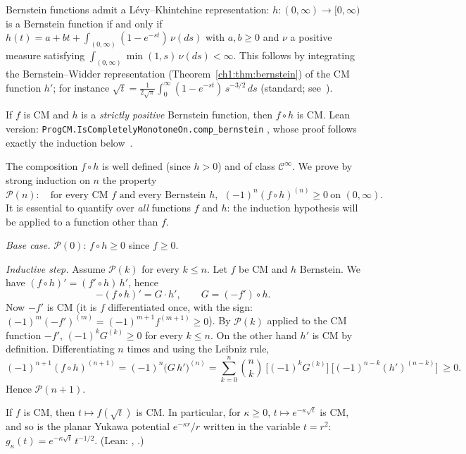 \begin{uniremark}\tierL{} Bernstein functions admit a L\'evy--Khintchine representation: $h:(0,\infty)\to[0,\infty)$ is a Bernstein function
if and only if $h(t)=a+bt+\int_{(0,\infty)}(1-e^{-st})\,\nu(ds)$ with $a,b\ge0$ and $\nu$ a positive measure satisfying
$\int_{(0,\infty)}\min(1,s)\,\nu(ds)<\infty$. This follows by integrating the Bernstein--Widder representation (Theorem~\ref{ch1:thm:bernstein})
of the CM function $h'$; for instance $\sqrt t=\frac{1}{2\sqrt\pi}\int_0^\infty(1-e^{-st})\,s^{-3/2}\,ds$ (standard; see~\cite{ch2ssv}).
\end{uniremark}

\begin{theorem}\label{ch1:thm:comp}
If $f$ is CM and $h$ is a \emph{strictly positive} Bernstein function, then $f\circ h$ is CM. \tierC{} Lean version:
\texttt{ProgCM.IsCompletelyMonotoneOn\allowbreak .comp\_bernstein} \tierA{}, whose proof follows exactly the induction below~\cite{p3}.
\end{theorem}

\begin{humanproof}
The composition $f\circ h$ is well defined (since $h>0$) and of class $\mathcal C^\infty$. We prove by strong induction on $n$ the property
\[
  \mathcal P(n) :\quad \text{for every CM } f \text{ and every Bernstein } h,\ \ (-1)^n(f\circ h)^{(n)}\ge0\ \text{on }(0,\infty).
\]
It is essential to quantify over \emph{all} functions $f$ and $h$: the induction hypothesis will be applied to a function other than $f$.

\emph{Base case.} $\mathcal P(0)$: $f\circ h\ge0$ since $f\ge0$.

\emph{Inductive step.} Assume $\mathcal P(k)$ for every $k\le n$. Let $f$ be CM and $h$ Bernstein. We have $(f\circ h)'=(f'\circ h)\,h'$, hence
\[
  -(f\circ h)'=G\cdot h',\qquad G=(-f')\circ h .
\]
Now $-f'$ is CM (it is $f$ differentiated once, with the sign: $(-1)^m(-f')^{(m)}=(-1)^{m+1}f^{(m+1)}\ge0$). By $\mathcal P(k)$ applied to the CM function $-f'$,
$(-1)^kG^{(k)}\ge0$ for every $k\le n$. On the other hand $h'$ is CM by definition. Differentiating $n$ times and using the Leibniz rule,
\[
  (-1)^{n+1}(f\circ h)^{(n+1)}=(-1)^{n}\bigl(G\,h'\bigr)^{(n)}=\sum_{k=0}^{n}\binom nk\ \bigl[(-1)^kG^{(k)}\bigr]\ \bigl[(-1)^{n-k}(h')^{(n-k)}\bigr]\ \ge0 .
\]
Hence $\mathcal P(n+1)$.
\end{humanproof}

\begin{corollary}\label{ch1:cor:sqrt}
If $f$ is CM, then $t\mapsto f(\sqrt t)$ is CM. In particular, for $\kappa\ge0$, $t\mapsto e^{-\kappa\sqrt t}$ is CM, and so is the
planar Yukawa potential $e^{-\kappa r}/r$ written in the variable $t=r^2$: $g_\kappa(t)=e^{-\kappa\sqrt t}\,t^{-1/2}$. \tierC{}
(Lean: ,  \tierA{}.)
\end{corollary}

